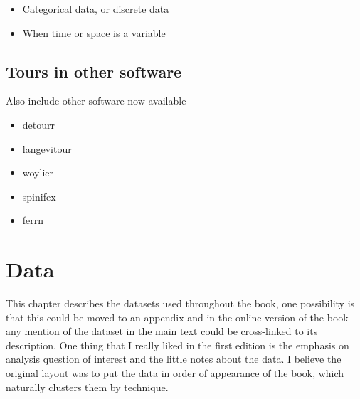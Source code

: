 \documentclass[
  letterpaper,
]{book}
\providecommand{\tightlist}{%
  \setlength{\itemsep}{0pt}\setlength{\parskip}{0pt}}\usepackage{longtable,booktabs,array}
\begin{document}
\begin{itemize}
\tightlist
\item
  Categorical data, or discrete data
\item
  When time or space is a variable
\end{itemize}

\hypertarget{tours-in-other-software}{%
\section{Tours in other software}\label{tours-in-other-software}}

Also include other software now available

\begin{itemize}
\tightlist
\item
  detourr
\item
  langevitour
\item
  woylier
\item
  spinifex
\item
  ferrn
\end{itemize}

\hypertarget{data}{%
\chapter{Data}\label{data}}

This chapter describes the datasets used throughout the book, one
possibility is that this could be moved to an appendix and in the online
version of the book any mention of the dataset in the main text could be
cross-linked to its description. One thing that I really liked in the
first edition is the emphasis on analysis question of interest and the
little notes about the data. I believe the original layout was to put
the data in order of appearance of the book, which naturally clusters
them by technique.
\end{document}
